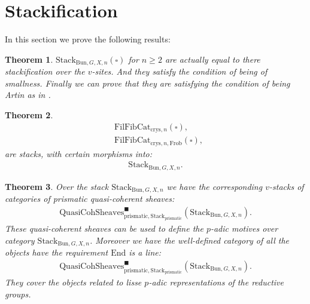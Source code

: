 \documentclass[12pt]{article}
\newtheorem{theorem}{Theorem}
\theoremstyle{definition}
\begin{document}
\section{Stackification}

\noindent In this section we prove the following results:


\begin{theorem}
$\mathrm{Stack}_{\mathrm{Bun},G,X,n}(\square)$ for $n\geq 2$ are actually equal to there stackification over the $v$-sites. And they satisfy the condition of being of smallness. Finally we can prove that they are satisfying the condition of being Artin as in \cite{FS}.
\end{theorem}

\begin{theorem}
\begin{align}
&\mathrm{FilFibCat}_{\mathrm{crys},n}(\square),\\
&\mathrm{FilFibCat}_{\mathrm{crys},n,\mathrm{Frob}}(\square),
\end{align} 
are stacks, with certain morphisms into:
\begin{align}
\mathrm{Stack}_{\mathrm{Bun},G,X,n}.
\end{align}
\end{theorem}

\begin{theorem}
Over the stack $\mathrm{Stack}_{\mathrm{Bun},G,X,n}$ we have the corresponding $v$-stacks of categories of prismatic quasi-coherent sheaves:
\begin{align}
\mathrm{QuasiCohSheaves}^\blacksquare_{\mathrm{prismatic},\mathrm{Stack}_{\mathrm{prismatic}}}(\mathrm{Stack}_{\mathrm{Bun},G,X,n}).
\end{align}
These quasi-coherent sheaves can be used to define the $p$-adic motives over category $\mathrm{Stack}_{\mathrm{Bun},G,X,n}$. Moreover we have the well-defined category of all the objects have the requirement $\mathrm{End}$ is a line:
\begin{align}
\mathrm{QuasiCohSheaves}^\blacksquare_{\mathrm{prismatic},\mathrm{Stack}_{\mathrm{prismatic}}}(\mathrm{Stack}_{\mathrm{Bun},G,X,n}).
\end{align}
They cover the objects related to lisse $p$-adic representations of the reductive groups.
\end{theorem}
\end{document}
